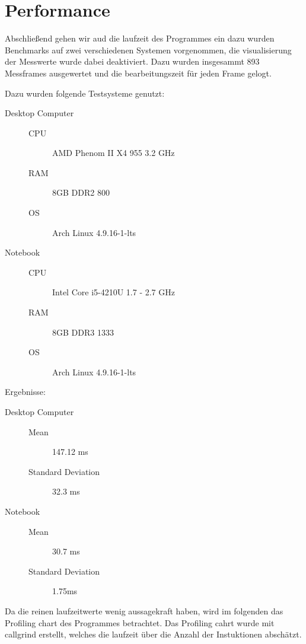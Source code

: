 \documentclass[11pt,oneside,openright]{mpreport}
\begin{document}
\section{Performance}

Abschließend gehen wir aud die laufzeit des Programmes ein dazu wurden Benchmarks auf zwei verschiedenen Systemen vorgenommen, die visualisierung der Messwerte wurde dabei deaktiviert.
Dazu wurden insgesammt 893 Messframes ausgewertet und die bearbeitungszeit für jeden Frame gelogt. 

Dazu wurden folgende Testsysteme genutzt:
\begin{description}
\item[Desktop Computer]\hfill
\begin{description}
\item[CPU] AMD Phenom II X4 955 3.2 GHz
\item[RAM] 8GB DDR2 800
\item[OS] Arch Linux 4.9.16-1-lts
\end{description}
\item[Notebook]\hfill
\begin{description}
\item[CPU] Intel Core i5-4210U 1.7 - 2.7 GHz
\item[RAM] 8GB DDR3 1333
\item[OS] Arch Linux 4.9.16-1-lts
\end{description}
\end{description}

Ergebnisse:

\begin{description}
\item[Desktop Computer]\hfill
\begin{description}
\item[Mean] 147.12 ms
\item[Standard Deviation] 32.3 ms
\end{description}
\item[Notebook]\hfill
\begin{description}
\item[Mean] 30.7 ms
\item[Standard Deviation] 1.75ms
\end{description}
\end{description}

Da die reinen laufzeitwerte wenig aussagekraft haben, wird im folgenden das Profiling chart des Programmes betrachtet.
Das Profiling cahrt wurde mit callgrind erstellt, welches die laufzeit über die Anzahl der Instuktionen abschätzt.
\end{document}

